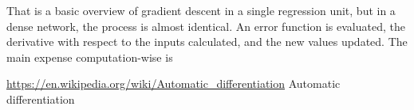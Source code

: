 \documentclass{article}
\begin{document}
    That is a basic overview of gradient descent in a single regression unit, but in a dense network, the process is almost identical. An error function is evaluated, 
    the derivative with respect to the inputs calculated, and the new values updated. The main expense computation-wise is 




    \pagebreak

    \noindent \url{https://en.wikipedia.org/wiki/Automatic_differentiation} Automatic differentiation
\end{document}
